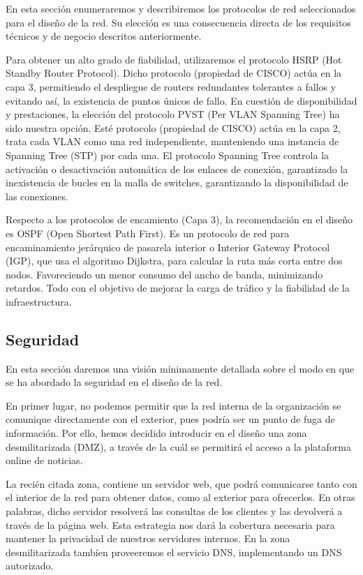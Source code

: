 \documentclass[a4paper,onecolumn,11pt]{article}
\begin{document}
En esta sección enumeraremos y describiremos los protocolos de red seleccionados para el diseño de la red. Su elección es una consecuencia directa de los requisitos técnicos y de negocio descritos anteriormente.

Para obtener un alto grado de fiabilidad, utilizaremos el protocolo HSRP (Hot Standby Router Protocol). Dicho protocolo (propiedad de CISCO) actúa en la capa 3, permitiendo el despliegue de routers redundantes tolerantes a fallos y evitando así, la existencia de puntos únicos de fallo. En cuestión de disponibilidad y prestaciones, la elección del protocolo PVST (Per VLAN Spanning Tree) ha sido nuestra opción. Esté protocolo (propiedad de CISCO) actúa en la capa 2, trata cada VLAN como una red independiente, manteniendo una instancia de Spanning Tree (STP) por cada una. El protocolo Spanning Tree controla la activación o desactivación automática de los enlaces de conexión, garantizado la inexistencia de bucles en la malla de switches, garantizando la disponibilidad de las conexiones.

Respecto a los protocolos de encamiento (Capa 3), la recomendación en el diseño es OSPF (Open Shortest Path First).  Es un protocolo de red para encaminamiento jerárquico de pasarela interior o Interior Gateway Protocol (IGP), que usa el algoritmo Dijkstra, para calcular la ruta más corta entre dos nodos. Favoreciendo un menor consumo del ancho de banda, minimizando retardos. Todo con el objetivo de mejorar la carga de tráfico y la fiabilidad de la infraestructura.

\subsection{Seguridad}

En esta sección daremos una visión mínimamente detallada sobre el modo en que se ha abordado la seguridad en el diseño de la red. 

En primer lugar, no podemos permitir que la red interna de la organización se comunique directamente con el exterior, pues podría ser un punto de fuga de información. Por ello, hemos decidido introducir en el diseño una zona desmilitarizada (DMZ), a través de la cuál se permitirá el acceso a la plataforma online de noticias.

La recién citada zona, contiene un servidor web, que podrá comunicarse tanto con el interior de la red para obtener datos, como al exterior para ofrecerlos. En otras palabras, dicho servidor resolverá las consultas de los clientes y las devolverá a través de la página web. Esta estrategia nos dará la cobertura necesaria para mantener la privacidad de nuestros servidores internos. En la zona desmilitarizada tambíen proveeremos el servicio DNS, implementando un DNS autorizado.
\end{document}
